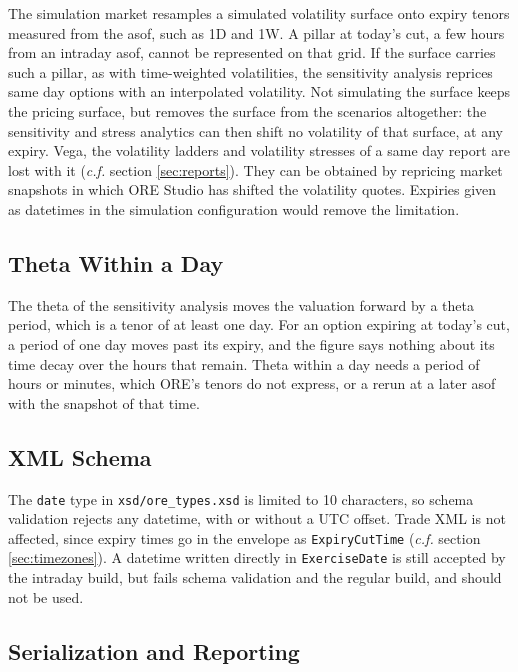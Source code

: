 \documentclass[12pt, a4paper]{article}
\begin{document}
The simulation market resamples a simulated volatility surface onto expiry tenors measured from the asof, such as
1D and 1W. A pillar at today's cut, a few hours from an intraday asof, cannot be represented on that grid. If the
surface carries such a pillar, as with time-weighted volatilities, the sensitivity analysis reprices same day options with an
interpolated volatility. Not simulating the surface keeps the pricing surface, but removes the surface from the
scenarios altogether: the sensitivity and stress analytics can then shift no volatility of that surface, at any expiry.
Vega, the volatility ladders and volatility stresses of a same day report are lost with it (\textit{c.f.} section
\ref{sec:reports}). They can be obtained by repricing market snapshots in which ORE Studio has shifted the volatility
quotes. Expiries given as datetimes in the simulation configuration would remove the limitation.

\subsection{Theta Within a Day}\label{sec:lim-theta}

The theta of the sensitivity analysis moves the valuation forward by a theta period, which is a tenor of at least one
day. For an option expiring at today's cut, a period of one day moves past its expiry, and the figure says nothing
about its time decay over the hours that remain. Theta within a day needs a period of hours or minutes, which ORE's tenors
do not express, or a rerun at a later asof with the snapshot of that time.

\subsection{XML Schema}\label{sec:lim-xsd}

The \texttt{date} type in \texttt{xsd/ore\_types.xsd} is limited to 10 characters, so schema validation rejects any
datetime, with or without a UTC offset. Trade XML is not affected, since expiry times go in the envelope as
\texttt{ExpiryCutTime} (\textit{c.f.} section \ref{sec:timezones}). A datetime written directly in \texttt{ExerciseDate} is still
accepted by the intraday build, but fails schema validation and the regular build, and should not be used.

\subsection{Serialization and Reporting}\label{sec:lim-serialization}
\end{document}
